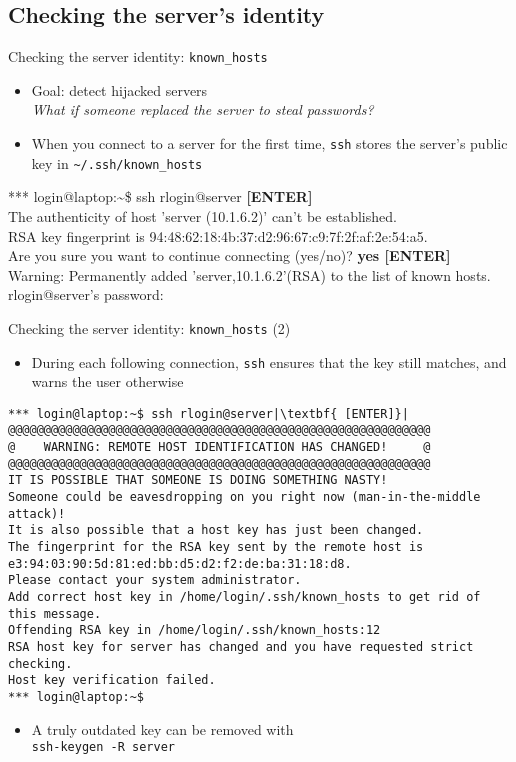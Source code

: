 \documentclass[11pt,final,usepdftitle=false]{beamer}
\newcommand{\tilda}{\textasciitilde{}}
\begin{document}
\subsection{Checking the server's identity}

\begin{frame}{Checking the server identity: \texttt{known\_hosts}}
\begin{itemize}
\item Goal: detect hijacked servers\\
\textsl{What if someone replaced the server to steal passwords?}
\hbr
\item When you connect to a server for the first time, \texttt{ssh} stores the server's public key in
	\texttt{\tilda/.ssh/known\_hosts}
\end{itemize}
{\ttfamily\small
*** login@laptop:\tilda\$ ssh rlogin@server\textbf{ [ENTER]}\\ 
The authenticity of host 'server (10.1.6.2)' can't be established.\\
RSA key fingerprint is 94:48:62:18:4b:37:d2:96:67:c9:7f:2f:af:2e:54:a5.\\
Are you sure you want to continue connecting (yes/no)? \textbf{yes [ENTER]}\\ 
Warning: Permanently added 'server,10.1.6.2'(RSA) to the list of known hosts.\\
rlogin@server's password:\\ }
\end{frame}

\begin{frame}[fragile]{Checking the server identity: \texttt{known\_hosts} (2)}
\begin{itemize}
\item During each following connection, \texttt{ssh} ensures that the key still matches, and warns the user otherwise
\end{itemize}
\begin{lstlisting}[basicstyle=\ttfamily\ssmall,escapeinside={||}]
*** login@laptop:~$ ssh rlogin@server|\textbf{ [ENTER]}|
@@@@@@@@@@@@@@@@@@@@@@@@@@@@@@@@@@@@@@@@@@@@@@@@@@@@@@@@@@@
@    WARNING: REMOTE HOST IDENTIFICATION HAS CHANGED!     @
@@@@@@@@@@@@@@@@@@@@@@@@@@@@@@@@@@@@@@@@@@@@@@@@@@@@@@@@@@@
IT IS POSSIBLE THAT SOMEONE IS DOING SOMETHING NASTY!
Someone could be eavesdropping on you right now (man-in-the-middle attack)!
It is also possible that a host key has just been changed.
The fingerprint for the RSA key sent by the remote host is
e3:94:03:90:5d:81:ed:bb:d5:d2:f2:de:ba:31:18:d8.
Please contact your system administrator.
Add correct host key in /home/login/.ssh/known_hosts to get rid of this message.
Offending RSA key in /home/login/.ssh/known_hosts:12
RSA host key for server has changed and you have requested strict checking.
Host key verification failed.
*** login@laptop:~$ 
\end{lstlisting}
\begin{itemize}
	\item A truly outdated key can be removed with\\ \texttt{ssh-keygen -R server}
\end{itemize}
\end{frame}
\end{document}
